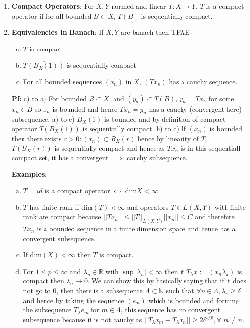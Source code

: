 \documentclass{article}
\begin{document}
\begin{enumerate}
    \item \textbf{Compact Operators}: For \(X, Y\) normed and linear \(T:X \to Y\), \(T\) is a compact operator if for all bounded \(B \subset X\), \(\overline{T(B)}\) is sequentially compact.

    \item \textbf{Equivalencies in Banach}: If \(X, Y\) are banach then TFAE
    \begin{enumerate} [a.]
        \item \(T\) is compact
        \item \(\overline{T(B_X(1))}\) is sequentially compact
        \item For all bounded sequences \((x_n)\) in \(X\), \((Tx_n)\) has a cauchy sequence. 
    \end{enumerate}
    \textbf{Pf:} c) to a) For bounded \(B \subset X\), and \((y_n) \subset T(B)\), \(y_n = Tx_n\) for some \(x_n\in B\) so \(x_n\) is bounded and hence \(Tx_n = y_n\) has a cauchy (convergent here) subsequence. a) to c) \(B_X(1)\) is bounded and by definition of compact operator \(\overline{T(B_X(1))}\) is sequentially compact. b) to c) If \((x_n)\) is bounded then there exists \(r > 0:(x_n) \subset B_X(r)\) hence by linearity of \(T\), \(\overline{T(B_X(r))}\) is sequentially compact and hence as \(Tx_n\) is in this sequentiall compact set, it has a convergent \(\implies\) cauchy subsequence.

    \textbf{Examples}:
    \begin{enumerate} [a.]
        \item \(T= id\) is a compact operator \(\iff\) dim\(X<\infty\).
        \item \(T\) has finite rank if dim\((T) < \infty\) and operators \(T \in L(X,Y)\) with finite rank are compact because \(||Tx_n|| \leq ||T||_{L(X,Y)}||x_n|| \leq C\) and therefore \(Tx_n\) is a bounded sequence in a finite dimension space and hence has a convergent subsequence.
        \item If dim\((X)< \infty\) then \(T\) is compact.
        \item For \(1 \leq p \leq \infty\) and \(\lambda_n \in \mathbb{R}\) with \(\sup|\lambda_n| < \infty\) then if \(T_\lambda x := (x_n \lambda_n) \) is compact then \(\lambda_n \to 0\). We can show this by basically saying that if it does not go to 0, then there is a subsequence \(\Lambda \subset \mathbb{N}\) such that \(\forall n \in \Lambda, \lambda_n \geq \delta\) and hence by taking the sequence \((e_m)\) which is bounded and forming the subsequence \(T_\lambda e_m\) for \(m \in \Lambda\), this sequence has no convergent subsequence because it is not cauchy as \(||T_\lambda x_m - T_\lambda x_n|| \geq 2 \delta^{1/p} , \forall \; m\neq n\).
    \end{enumerate}
    

\end{enumerate}
\end{document}
